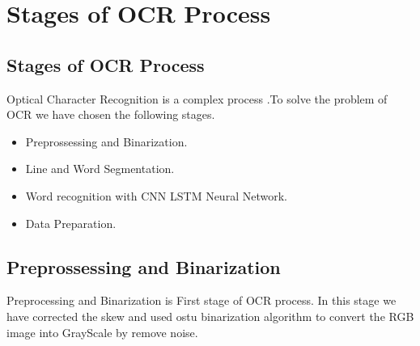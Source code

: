 
\chapter{Stages of OCR Process} %

\label{Chapter2} %


\section{Stages of OCR Process }
Optical Character Recognition is a complex process .To solve the problem of OCR we have chosen the following stages.
\begin{itemize}
  
  \item Preprossessing and Binarization.
  \item Line and Word Segmentation.
  \item Word recognition with CNN LSTM Neural Network.
  \item Data Preparation.
\end{itemize}


\section{Preprossessing and Binarization}
Preprocessing and Binarization is First stage of OCR process. In this stage we have corrected the skew and used ostu binarization algorithm to convert the RGB image into GrayScale by remove noise.

